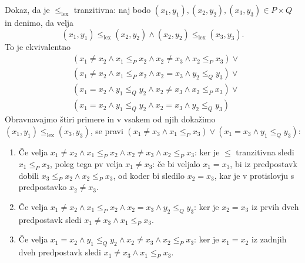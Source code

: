 \begin{dokaz}
  Dokaz, da je $\leq_\mathrm{lex}$ tranzitivna: naj bodo $(x_1,y_1), (x_2,y_2), (x_3, y_3) \in P \times Q$ in denimo, da velja
  \begin{equation*}
    (x_1, y_1) \leq_\mathrm{lex} (x_2, y_2) \land (x_2, y_2) \leq_\mathrm{lex} (x_3, y_3).
  \end{equation*}
  To je ekvivalentno
  \begin{align*}
  & (x_1 \neq x_2 \land x_1 \leq_P x_2 \land x_2 \neq x_3 \land x_2 \leq_P x_3) \lor  {} \\
  & (x_1 \neq x_2 \land x_1 \leq_P x_2 \land x_2 = x_3 \land y_2 \leq_Q y_3) \lor {} \\
  & (x_1 = x_2 \land y_1 \leq_Q y_2 \land x_2 \neq x_3 \land x_2 \leq_P x_3) \lor {} \\
  & (x_1 = x_2 \land y_1 \leq_Q y_2 \land x_2 = x_3 \land y_2 \leq_Q y_3)
  \end{align*}
  Obravnavajmo štiri primere in v vsakem od njih dokažimo $(x_1, y_1) \leq_\mathrm{lex} (x_3, y_3)$, se pravi
  $(x_1 \neq x_3 \land x_1 \leq_P x_3) \lor (x_1 = x_3 \land y_1 \leq_Q y_3)$:
  \begin{enumerate}
  \item Če velja $x_1 \neq x_2 \land x_1 \leq_P x_2 \land x_2 \neq x_3 \land x_2 \leq_P x_3$: ker je $\leq$ tranzitivna sledi $x_1 \leq_P x_3$, poleg tega pv velja $x_1 \neq
    x_3$: če bi veljalo $x_1 = x_3$, bi iz predpostavk dobili $x_3 \leq_P x_2 \land x_2 \leq_P x_3$, od koder bi sledilo $x_2 = x_3$, kar je v
    protislovju s predpostavko $x_2 \neq x_3$.

  \item Če velja $x_1 \neq x_2 \land x_1 \leq_P x_2 \land x_2 = x_3 \land y_2 \leq_Q y_3$: ker je $x_2 = x_3$ iz prvih dveh predpostavk sledi $x_1 \neq x_3 \land x_1 \leq_P x_3$.

  \item Če velja $x_1 = x_2 \land y_1 \leq_Q y_2 \land x_2 \neq x_3 \land x_2 \leq_P x_3$: ker je $x_1 = x_2$ iz zadnjih dveh predpostavk sledi $x_1 \neq x_3 \land x_1 \leq_P x_3$.


\end{enumerate}
\end{dokaz}
